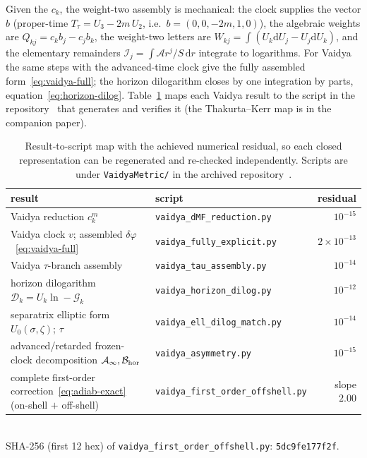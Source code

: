 \documentclass[12pt]{iopart}
\newcommand{\dd}{\mathrm{d}}
\begin{document}
Given the $c_k$, the weight-two assembly is mechanical: the clock supplies the vector
$b$ (proper-time $T_\tau=U_3-2m\,U_2$, i.e.\ $b=(0,0,-2m,1,0)$), the algebraic
weights are $Q_{kj}=c_kb_j-c_jb_k$, the weight-two
letters are $W_{kj}=\int(U_k\dd U_j-U_j\dd U_k)$, and the elementary remainders
$\mathcal{I}_j=\int\mathcal{A}r^j/S\,\dd r$ integrate to logarithms. For Vaidya the
same steps with the advanced-time clock give the fully assembled
form~\eqref{eq:vaidya-full}; the horizon dilogarithm closes by one integration by
parts, equation~\eqref{eq:horizon-dilog}. Table~\ref{tab:script-map} maps each Vaidya result to
the script in the repository~\cite{Rosignoli2026Code} that generates and verifies it (the
Thakurta--Kerr map is in the companion paper).
\begin{table}[htbp]
    \centering
    \caption{Result-to-script map with the achieved numerical residual, so each closed
    representation can be regenerated and re-checked independently. Scripts are under
    \texttt{VaidyaMetric/} in the archived repository~\cite{Rosignoli2026Code}.}
    \label{tab:script-map}
    \small
    \begin{tabular}{@{}p{}>{\raggedright\arraybackslash}p{}r@{}}
        \hline\hline
        result & script & residual\\
        \hline
        Vaidya reduction $c_k^m$
            & \texttt{vaidya\_dMF\_reduction.py} & $10^{-15}$\\
        Vaidya clock $v$; assembled $\delta\varphi$~\eqref{eq:vaidya-full}
            & \texttt{vaidya\_fully\_explicit.py} & $2\times10^{-13}$\\
        Vaidya $\tau$-branch assembly
            & \texttt{vaidya\_tau\_assembly.py} & $10^{-14}$\\
        horizon dilogarithm $\mathcal{D}_k=U_k\ln-\mathcal{G}_k$
            & \texttt{vaidya\_horizon\_dilog.py} & $10^{-12}$\\
        separatrix elliptic form $U_0(\sigma,\zeta)$; $\tau$
            & \texttt{vaidya\_ell\_dilog\_match.py} & $10^{-14}$\\
        advanced/retarded frozen-clock decomposition $\mathcal{A}_\infty,\mathcal{B}_{\rm hor}$
            & \texttt{vaidya\_asymmetry.py} & $10^{-15}$\\
        complete first-order correction~\eqref{eq:adiab-exact} (on-shell $+$ off-shell)
            & \texttt{vaidya\_first\_\allowbreak order\_\allowbreak offshell.py} & slope $2.00$\\
        \hline\hline
    \end{tabular}
    \\[2pt]
    {\footnotesize SHA-256 (first 12 hex) of
    \texttt{vaidya\_first\_order\_offshell.py}: \texttt{5dc9fe177f2f}.}
\end{table}
\end{document}
